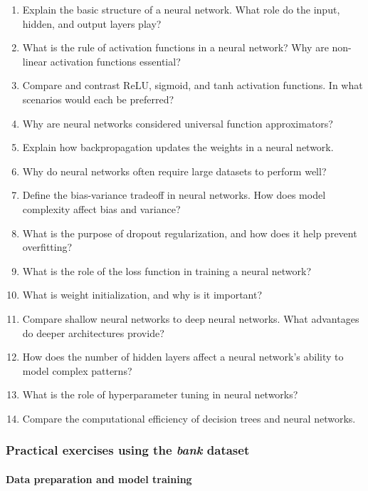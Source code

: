 \documentclass[
  11pt,
]{book}
\providecommand{\tightlist}{%
  \setlength{\itemsep}{0pt}\setlength{\parskip}{0pt}}
\theoremstyle{definition}
\theoremstyle{definition}
\theoremstyle{definition}
\theoremstyle{definition}
\theoremstyle{remark}
\begin{document}
\begin{enumerate}
\def\labelenumi{\arabic{enumi}.}
\tightlist
\item
  Explain the basic structure of a neural network. What role do the input, hidden, and output layers play?
\item
  What is the rule of activation functions in a neural network? Why are non-linear activation functions essential?
\item
  Compare and contrast ReLU, sigmoid, and tanh activation functions. In what scenarios would each be preferred?
\item
  Why are neural networks considered universal function approximators?
\item
  Explain how backpropagation updates the weights in a neural network.
\item
  Why do neural networks often require large datasets to perform well?
\item
  Define the bias-variance tradeoff in neural networks. How does model complexity affect bias and variance?
\item
  What is the purpose of dropout regularization, and how does it help prevent overfitting?
\item
  What is the role of the loss function in training a neural network?
\item
  What is weight initialization, and why is it important?
\item
  Compare shallow neural networks to deep neural networks. What advantages do deeper architectures provide?
\item
  How does the number of hidden layers affect a neural network's ability to model complex patterns?
\item
  What is the role of hyperparameter tuning in neural networks?
\item
  Compare the computational efficiency of decision trees and neural networks.
\end{enumerate}

\subsubsection*{\texorpdfstring{Practical exercises using the \emph{bank} dataset}{Practical exercises using the bank dataset}}\label{practical-exercises-using-the-bank-dataset-1}


\paragraph*{Data preparation and model training}\label{data-preparation-and-model-training}
\end{document}
